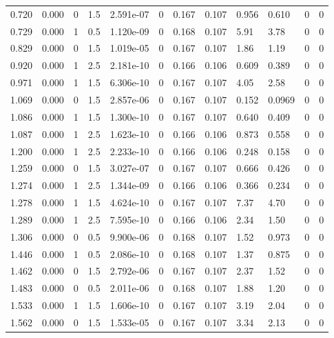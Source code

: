 \documentclass[preview]{standalone}
\begin{document}
{{\begin{tabular}{L{1.2cm}C{1.2cm} C{0.3cm}C{0.5cm} C{1.4cm}C{1.4cm} C{1.4cm}C{1.4cm} C{1.6cm}C{1.6cm} C{1.6cm}C{1.6cm}}
  0.720  &  0.000  & 0     & 1.5 &  2.591e-07  & 0  &  0.167&   0.107& 0.956 & 0.610   &  0 & 0  \\ 
  0.729  &  0.000  & 1     & 0.5 &  1.120e-09  & 0  &  0.168&   0.107& 5.91 & 3.78   &  0 & 0  \\ 
  0.829  &  0.000  & 0     & 1.5 &  1.019e-05  & 0  &  0.167&   0.107& 1.86 & 1.19   &  0 & 0  \\ 
  0.920  &  0.000  & 1     & 2.5 &  2.181e-10  & 0  &  0.166&   0.106& 0.609 & 0.389   &  0 & 0  \\ 
  0.971  &  0.000  & 1     & 1.5 &  6.306e-10  & 0  &  0.167&   0.107& 4.05 & 2.58   &  0 & 0  \\ 
  1.069  &  0.000  & 0     & 1.5 &  2.857e-06  & 0  &  0.167&   0.107& 0.152 & 0.0969   &  0 & 0  \\ 
  1.086  &  0.000  & 1     & 1.5 &  1.300e-10  & 0  &  0.167&   0.107& 0.640 & 0.409   &  0 & 0  \\ 
  1.087  &  0.000  & 1     & 2.5 &  1.623e-10  & 0  &  0.166&   0.106& 0.873 & 0.558   &  0 & 0  \\ 
  1.200  &  0.000  & 1     & 2.5 &  2.233e-10  & 0  &  0.166&   0.106& 0.248 & 0.158   &  0 & 0  \\ 
  1.259  &  0.000  & 0     & 1.5 &  3.027e-07  & 0  &  0.167&   0.107& 0.666 & 0.426   &  0 & 0  \\ 
  1.274  &  0.000  & 1     & 2.5 &  1.344e-09  & 0  &  0.166&   0.106& 0.366 & 0.234   &  0 & 0  \\ 
  1.278  &  0.000  & 1     & 1.5 &  4.624e-10  & 0  &  0.167&   0.107& 7.37 & 4.70   &  0 & 0  \\ 
  1.289  &  0.000  & 1     & 2.5 &  7.595e-10  & 0  &  0.166&   0.106& 2.34 & 1.50   &  0 & 0  \\ 
  1.306  &  0.000  & 0     & 0.5 &  9.900e-06  & 0  &  0.168&   0.107& 1.52 & 0.973   &  0 & 0  \\ 
  1.446  &  0.000  & 1     & 0.5 &  2.086e-10  & 0  &  0.168&   0.107& 1.37 & 0.875   &  0 & 0  \\ 
  1.462  &  0.000  & 0     & 1.5 &  2.792e-06  & 0  &  0.167&   0.107& 2.37 & 1.52   &  0 & 0  \\ 
  1.483  &  0.000  & 0     & 0.5 &  2.011e-06  & 0  &  0.168&   0.107& 1.88 & 1.20   &  0 & 0  \\ 
  1.533  &  0.000  & 1     & 1.5 &  1.606e-10  & 0  &  0.167&   0.107& 3.19 & 2.04   &  0 & 0  \\ 
  1.562  &  0.000  & 0     & 1.5 &  1.533e-05  & 0  &  0.167&   0.107& 3.34 & 2.13   &  0 & 0  \\ 

\end{tabular}}}
\end{document}
